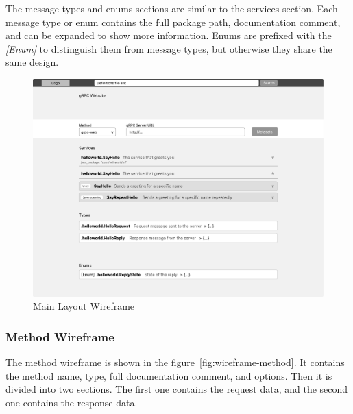 The message types and enums sections are similar to the services section.
Each message type or enum contains the full package path, documentation comment, and can be expanded to show more information.
Enums are prefixed with the \textit{[Enum]} to distinguish them from message types, but otherwise they share the same design.


\begin{figure}[hbt!]
    \centering
    \captionsetup{justification=centering}
    \includegraphics[width=1.0\textwidth]{images/design/wireframes/main-layout}
    \caption{Main Layout Wireframe}
    \label{fig:wireframe-main-layout}
\end{figure}

\subsubsection{Method Wireframe}
The method wireframe is shown in the figure~\ref{fig:wireframe-method}.
It contains the method name, type, full documentation comment, and options.
Then it is divided into two sections.
The first one contains the request data, and the second one contains the response data.

